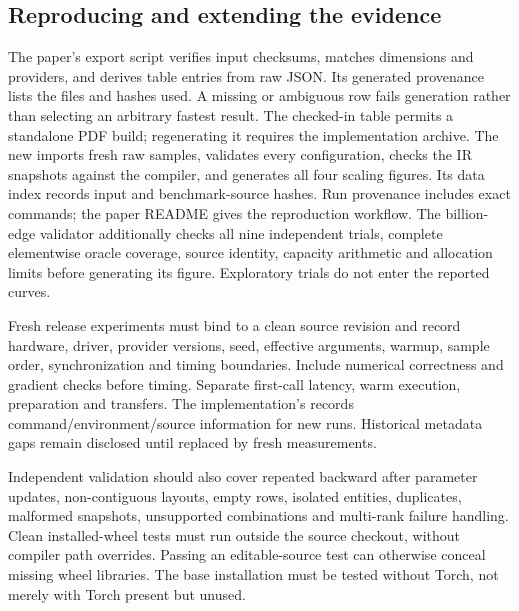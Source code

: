 \subsection{Reproducing and extending the evidence}
The paper's export script verifies input checksums, matches dimensions and
providers, and derives table entries from raw JSON. Its generated provenance lists
the files and hashes used. A missing or ambiguous row fails generation rather
than selecting an arbitrary fastest result. The checked-in table permits a
standalone PDF build; regenerating it requires the implementation archive.
The new  imports fresh raw samples, validates every
configuration, checks the IR snapshots against the compiler, and generates all
four scaling figures. Its data index records input and benchmark-source hashes.
Run provenance includes exact commands; the paper README gives the reproduction
workflow. The billion-edge validator additionally checks all nine independent
trials, complete elementwise oracle coverage, source identity, capacity arithmetic
and allocation limits before generating its figure. Exploratory trials do not
enter the reported curves.

Fresh release experiments must bind to a clean source revision and record
hardware, driver, provider versions, seed, effective arguments, warmup, sample
order, synchronization and timing boundaries. Include numerical correctness and
gradient checks before timing. Separate first-call latency, warm execution,
preparation and transfers. The implementation's 
records command/environment/source information for new runs. Historical metadata
gaps remain disclosed until replaced by fresh measurements.

Independent validation should also cover repeated backward after parameter
updates, non-contiguous layouts, empty rows, isolated entities, duplicates,
malformed snapshots, unsupported combinations and multi-rank failure handling.
Clean installed-wheel tests must run outside the source checkout, without compiler
path overrides. Passing an editable-source test can otherwise conceal missing
wheel libraries. The base installation must be tested without Torch, not merely
with Torch present but unused.
